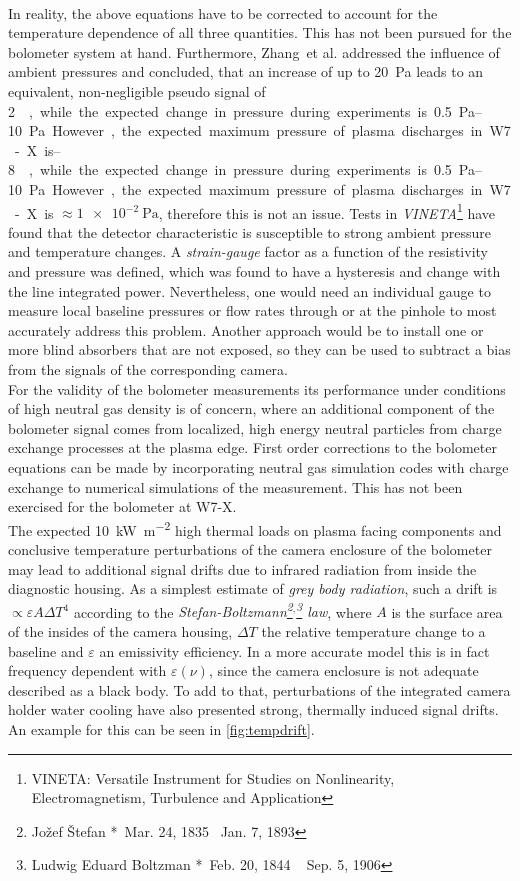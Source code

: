                 \,\\%
%
                In reality, the above equations have to be corrected to account for the temperature dependence of all three quantities.  This has not been pursued for the bolometer system at hand. Furthermore, Zhang~et al. addressed the influence\cite{Zhang2009} of ambient pressures and concluded, that an increase of up to \SI{20}{\pascal} leads to an equivalent, non-negligible pseudo signal of \SIrange{2}{8}{\watt\per\meter\square\per\pascal}, while the expected change in pressure during experiments is \SIrange{0.5}{10}{\pascal}. However, the expected maximum pressure of plasma discharges in W7-X is $\approx\SI{1e-2}{\pascal}$, therefore this is not an issue. Tests in \textit{VINETA}\footnote[1]{VINETA: Versatile Instrument for Studies on Nonlinearity, Electromagnetism, Turbulence and Application} have found that the detector characteristic is susceptible to strong ambient pressure and temperature changes. A \textit{strain-gauge} factor as a function of the resistivity and pressure was defined, which was found to have a hysteresis and change with the line integrated power\cite{Zhang2008}. Nevertheless, one would need an individual gauge to measure local baseline pressures or flow rates through or at the pinhole to most accurately address this problem. Another approach would be to install one or more blind absorbers that are not exposed, so they can be used to subtract a bias from the signals of the corresponding camera.\\%
                For the validity of the bolometer measurements its performance under conditions of high neutral gas density is of concern, where an additional component of the bolometer signal comes from localized, high energy neutral particles from charge exchange processes at the plasma edge. First order corrections to the bolometer equations can be made by incorporating neutral gas simulation codes with charge exchange to numerical simulations of the measurement\cite{Giannone1997}. This has not been exercised for the bolometer at W7-X.\\%
                The expected \SI{10}{\kilo\watt\per\square\meter} high thermal loads on plasma facing components and conclusive temperature perturbations of the camera enclosure of the bolometer may lead to additional signal drifts due to infrared radiation from inside the diagnostic housing. As a simplest estimate of \textit{grey body radiation}, such a drift is $\propto \varepsilon A\Delta T^{4}$ according to the \textit{Stefan-Boltzmann\footnote[1]{Jožef Štefan *~Mar. 24, 1835 \textdagger~Jan. 7, 1893}$^{, }$\footnote[2]{Ludwig Eduard Boltzman *~Feb. 20, 1844 \textdagger~ Sep. 5, 1906} law}, where $A$ is the surface area of the insides of the camera housing, $\Delta T$ the relative temperature change to a baseline and $\varepsilon$ an emissivity efficiency. In a more accurate model this is in fact frequency dependent with $\varepsilon\left(\nu\right)$, since the camera enclosure is not adequate described as a black body. To add to that, perturbations of the integrated camera holder water cooling have also presented strong, thermally induced signal drifts. An example for this can be seen in \cref{fig:tempdrift}.\\%
